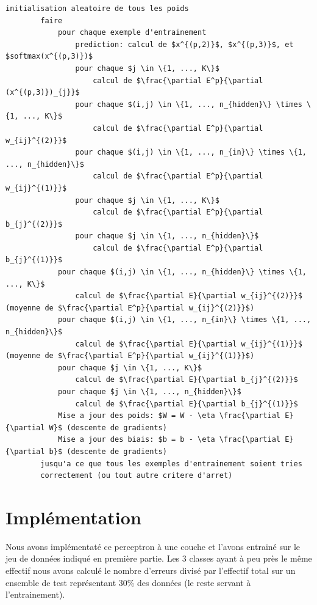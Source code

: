 \documentclass[a4paper,11pt,oneside,roman]{article}
\begin{document}
    \begin{lstlisting}[mathescape]
        initialisation aleatoire de tous les poids
        faire
            pour chaque exemple d'entrainement
                prediction: calcul de $x^{(p,2)}$, $x^{(p,3)}$, et $softmax(x^{(p,3)})$
                pour chaque $j \in \{1, ..., K\}$
                    calcul de $\frac{\partial E^p}{\partial (x^{(p,3)})_{j}}$
                pour chaque $(i,j) \in \{1, ..., n_{hidden}\} \times \{1, ..., K\}$
                    calcul de $\frac{\partial E^p}{\partial w_{ij}^{(2)}}$
                pour chaque $(i,j) \in \{1, ..., n_{in}\} \times \{1, ..., n_{hidden}\}$
                    calcul de $\frac{\partial E^p}{\partial w_{ij}^{(1)}}$
                pour chaque $j \in \{1, ..., K\}$
                    calcul de $\frac{\partial E^p}{\partial b_{j}^{(2)}}$
                pour chaque $j \in \{1, ..., n_{hidden}\}$
                    calcul de $\frac{\partial E^p}{\partial b_{j}^{(1)}}$
            pour chaque $(i,j) \in \{1, ..., n_{hidden}\} \times \{1, ..., K\}$
                calcul de $\frac{\partial E}{\partial w_{ij}^{(2)}}$ (moyenne de $\frac{\partial E^p}{\partial w_{ij}^{(2)}}$)
            pour chaque $(i,j) \in \{1, ..., n_{in}\} \times \{1, ..., n_{hidden}\}$
                calcul de $\frac{\partial E}{\partial w_{ij}^{(1)}}$ (moyenne de $\frac{\partial E^p}{\partial w_{ij}^{(1)}}$)
            pour chaque $j \in \{1, ..., K\}$
                calcul de $\frac{\partial E}{\partial b_{j}^{(2)}}$
            pour chaque $j \in \{1, ..., n_{hidden}\}$
                calcul de $\frac{\partial E}{\partial b_{j}^{(1)}}$
            Mise a jour des poids: $W = W - \eta \frac{\partial E}{\partial W}$ (descente de gradients)
            Mise a jour des biais: $b = b - \eta \frac{\partial E}{\partial b}$ (descente de gradients)
        jusqu'a ce que tous les exemples d'entrainement soient tries 
        correctement (ou tout autre critere d'arret)
    \end{lstlisting}

    \section{Implémentation}
    Nous avons implémentaté ce perceptron à une couche et l'avons entrainé sur le jeu de données indiqué en première partie.
    Les 3 classes ayant à peu près le même effectif nous avons calculé le nombre d'erreurs divisé par l'effectif total sur un ensemble de test représentant 30\% des données (le reste servant à l'entrainement).
    
\end{document}
